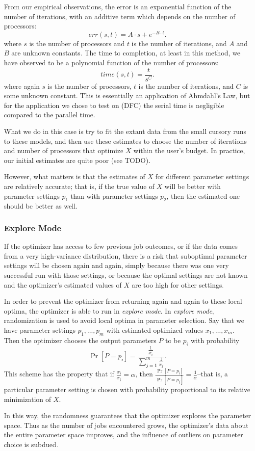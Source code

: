 From our empirical observations, the error is an exponential function of
the number of iterations, with an additive term which depends on the number
of processors:
\[
err(s,t) = A\cdot s + e^{-B\cdot t}.
\]
where $s$ is the number of processors and $t$ is the number of iterations, 
and $A$ and $B$ are unknown constants. The time to completion, at least 
in this method, we have observed to be a polynomial function of the 
number of processors:
\[
time(s,t) = \frac{t}{s^{C}}.
\]
where again $s$ is the number of processors, $t$ is the number of iterations, and $C$ is some unknown constant. This is essentially an application of 
Ahmdahl's Law, but for the application we chose to test on (DFC) the
serial time is negligible compared to the parallel time.

What we do in this case is try to fit the extant data from the small
cursory runs to these models, and then use these estimates to choose
the number of iterations and number of processors that optimize $X$ 
within the user's budget. In practice, our initial estimates are 
quite poor (see TODO). 

However, what matters is that the estimates of $X$ for different 
parameter settings are relatively accurate; that is, if the true value 
of $X$ will be better with parameter settings $p_1$ than with parameter
settings $p_2$, then the estimated one should be better as well.

\subsubsection{Explore Mode}
\label{sec:explore}
If the optimizer has access to few previous job outcomes, or if the data
comes from a very high-variance distribution, there is a risk that 
suboptimal parameter settings will be chosen again and again, simply 
because there was one very successful run with those settings, or because
the optimal settings are not known and the optimizer's estimated values
of $X$ are too high for other settings.

In order to prevent the optimizer from returning again and again to
these local optima, the optimizer is able to run in {\em explore mode}. 
In {\em explore mode}, randomization is
used to avoid local optima in parameter selection. Say that we have 
parameter settings $p_1, \ldots, p_m$ with estimated optimized values 
$x_1, \ldots, x_m$. Then the optimizer chooses the output parameters $P$ 
to be $p_i$ with probability
\[
\Pr[P = p_i] = \frac{\frac{1}{x_i}}{\sum_{j = 1}^m \frac{1}{x_j}}.
\]
This scheme has the property that if $\frac{x_i}{x_j} = \alpha$, 
then $\frac{\Pr[P = p_i]}{\Pr[P = p_j]} = \frac{1}{\alpha}$--that is, a 
particular parameter setting is chosen with probability proportional 
to its relative minimization of $X$.

In this way, the randomness guarantees that the optimizer explores the 
parameter space. Thus as the number of jobs encountered grows, 
the optimizer's data about the entire parameter space improves, and the
influence of outliers on parameter choice is subdued. 


